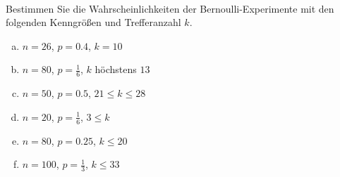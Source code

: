 \begin{aufgabe} ~ \\ 
Bestimmen Sie die Wahrscheinlichkeiten der Bernoulli-Experimente mit den folgenden Kenngrößen und Trefferanzahl $k$.\begin{multicols}{2} 
\begin{enumerate}[a)] 
\item 
$n=26$, $p=0.4$, $k=10$
\item 
$n=80$, $p=\frac{1}{6}$, $k$ höchstens $13$
\item 
$n=50$, $p=0.5$, $21\leq k \leq 28$
\item 
$n=20$, $p=\frac{1}{6}$, $3\leq k $
\item 
$n=80$, $p=0.25$, $k \leq 20$
\item 
$n=100$, $p=\frac{1}{3}$, $k \leq 33$
\end{enumerate} 
\end{multicols} 
\end{aufgabe} 
